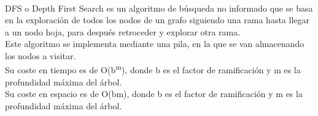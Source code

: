 \documentclass{report}
\begin{document}
          \paragraph*{}{
            DFS o Depth First Search es un algoritmo de búsqueda no informado que se basa en la exploración de todos los nodos de un grafo siguiendo una rama hasta llegar a un nodo hoja, para después retroceder y explorar otra rama.\\
            Este algoritmo se implementa mediante una pila, en la que se van almacenando los nodos a visitar.\\
            Su coste en tiempo es de O(b\textsuperscript{m}), donde b es el factor de ramificación y m es la profundidad máxima del árbol.\\
            Su coste en espacio es de O(bm), donde b es el factor de ramificación y m es la profundidad máxima del árbol.\\
          }  
\end{document}
